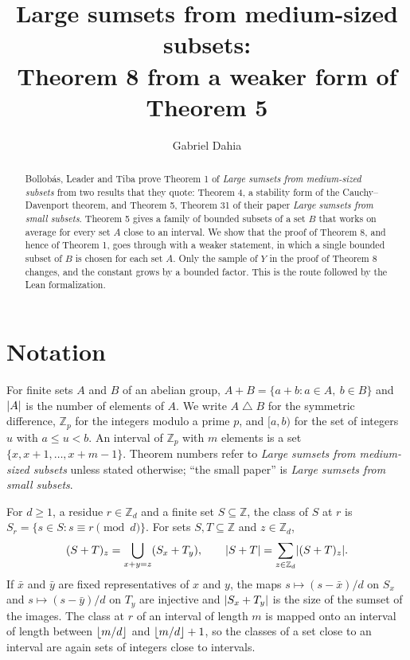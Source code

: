 \documentclass[11pt]{amsart}
\title[Theorem 8 from a weaker form of Theorem 5]{Large sumsets from medium-sized subsets:\\
Theorem 8 from a weaker form of Theorem 5}
\author{Gabriel Dahia}
\date{}
\theoremstyle{remark}
\newcommand{\Z}{\mathbb{Z}}
\DeclarePairedDelimiter{\abs}{\lvert}{\rvert}
\DeclarePairedDelimiter{\floor}{\lfloor}{\rfloor}
\begin{document}
\begin{abstract}
Bollobás, Leader and Tiba prove Theorem 1 of \emph{Large sumsets from medium-sized subsets} from
two results that they quote: Theorem 4, a stability form of the Cauchy--Davenport theorem, and
Theorem 5, Theorem 31 of their paper \emph{Large sumsets from small subsets}. Theorem 5 gives a
family of bounded subsets of a set $B$ that works on average for every set $A$ close to an
interval. We show that the proof of Theorem 8, and hence of Theorem 1, goes through with a weaker
statement, in which a single bounded subset of $B$ is chosen for each set $A$. Only the sample of
$Y$ in the proof of Theorem 8 changes, and the constant grows by a bounded factor. This is the
route followed by the Lean formalization.
\end{abstract}

\maketitle

\section{Notation}

For finite sets $A$ and $B$ of an abelian group, $A + B = \{a + b : a \in A,\ b \in B\}$ and
$\abs{A}$ is the number of elements of $A$. We write $A \mathbin{\triangle} B$ for the symmetric
difference, $\Z_p$ for the integers modulo a prime $p$, and $[a, b)$ for the set of integers $u$
with $a \le u < b$. An interval of $\Z_p$ with $m$ elements is a set
$\{x, x + 1, \dots, x + m - 1\}$. Theorem numbers refer to \emph{Large sumsets from
medium-sized subsets} unless stated otherwise; ``the small paper'' is \emph{Large sumsets from
small subsets}.

For $d \ge 1$, a residue $r \in \Z_d$ and a finite set $S \subseteq \Z$, the class of $S$ at $r$ is
$S_r = \{s \in S : s \equiv r \pmod d\}$. For sets $S, T \subseteq \Z$ and $z \in \Z_d$,
\begin{equation}\label{eq:classes}
  (S + T)_z = \bigcup_{x + y = z} (S_x + T_y),
  \qquad
  \abs{S + T} = \sum_{z \in \Z_d} \abs{(S + T)_z}.
\end{equation}
If $\bar x$ and $\bar y$ are fixed representatives of $x$ and $y$, the maps
$s \mapsto (s - \bar x)/d$ on $S_x$ and $s \mapsto (s - \bar y)/d$ on $T_y$ are injective and
$\abs{S_x + T_y}$ is the size of the sumset of the images. The class at $r$ of an interval of
length $m$ is mapped onto an interval of length between $\floor{m/d}$ and $\floor{m/d} + 1$, so
the classes of a set close to an interval are again sets of integers close to intervals.
\end{document}
